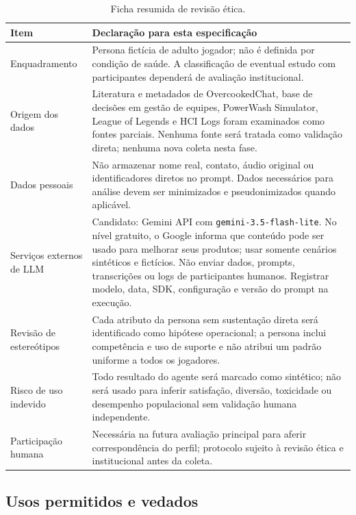 \documentclass[conference]{IEEEtran}
\begin{document}
\begin{table}[H]
\centering
\caption{Ficha resumida de revisão ética.}
\label{tab:etica}
\scriptsize
\begin{tabularx}{\columnwidth}{@{}p{1.35cm}Y@{}}
\toprule
\textbf{Item} & \textbf{Declaração para esta especificação} \\
\midrule
Enquadramento & Persona fictícia de adulto jogador; não é definida por condição de saúde. A classificação de eventual estudo com participantes dependerá de avaliação institucional. \\
Origem dos dados & Literatura e metadados de OvercookedChat, base de decisões em gestão de equipes, PowerWash Simulator, League of Legends e HCI Logs foram examinados como fontes parciais. Nenhuma fonte será tratada como validação direta; nenhuma nova coleta nesta fase. \\
Dados pessoais & Não armazenar nome real, contato, áudio original ou identificadores diretos no prompt. Dados necessários para análise devem ser minimizados e pseudonimizados quando aplicável. \\
Serviços externos de LLM & Candidato: Gemini API com \texttt{gemini-3.5-flash-lite}. No nível gratuito, o Google informa que conteúdo pode ser usado para melhorar seus produtos; usar somente cenários sintéticos e fictícios. Não enviar dados, prompts, transcrições ou logs de participantes humanos. Registrar modelo, data, SDK, configuração e versão do prompt na execução. \\
Revisão de estereótipos & Cada atributo da persona sem sustentação direta será identificado como hipótese operacional; a persona inclui competência e uso de suporte e não atribui um padrão uniforme a todos os jogadores. \\
Risco de uso indevido & Todo resultado do agente será marcado como sintético; não será usado para inferir satisfação, diversão, toxicidade ou desempenho populacional sem validação humana independente. \\
Participação humana & Necessária na futura avaliação principal para aferir correspondência do perfil; protocolo sujeito à revisão ética e institucional antes da coleta. \\
\bottomrule
\end{tabularx}
\end{table}

\subsection{Usos permitidos e vedados}
\end{document}
